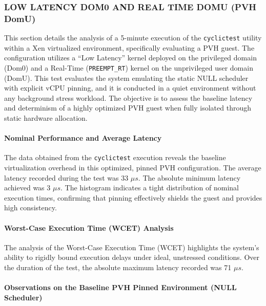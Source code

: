 \subsubsection{LOW LATENCY DOM0 AND REAL TIME DOMU (PVH
DomU)}\label{low-latency-dom0-and-real-time-domu-pvh-domu-2}

This section details the analysis of a 5-minute execution of the
\texttt{cyclictest} utility within a Xen virtualized environment,
specifically evaluating a PVH guest. The configuration utilizes a ``Low
Latency'' kernel deployed on the privileged domain (Dom0) and a
Real-Time (\texttt{PREEMPT\_RT}) kernel on the unprivileged user domain
(DomU). This test evaluates the system emulating the static NULL
scheduler with explicit vCPU pinning, and it is conducted in a quiet
environment without any background stress workload. The objective is to
assess the baseline latency and determinism of a highly optimized PVH
guest when fully isolated through static hardware allocation.

\paragraph{Nominal Performance and Average
Latency}\label{nominal-performance-and-average-latency-28}

The data obtained from the \texttt{cyclictest} execution reveals the
baseline virtualization overhead in this optimized, pinned PVH
configuration. The average latency recorded during the test was 33 $\mu s$.
The absolute minimum latency achieved was 3 $\mu s$. The histogram indicates
a tight distribution of nominal execution times, confirming that pinning
effectively shields the guest and provides high consistency.

\paragraph{Worst-Case Execution Time (WCET)
Analysis}\label{worst-case-execution-time-wcet-analysis-30}

The analysis of the Worst-Case Execution Time (WCET) highlights the
system's ability to rigidly bound execution delays under ideal,
unstressed conditions. Over the duration of the test, the absolute
maximum latency recorded was 71 $\mu s$.

\paragraph{Observations on the Baseline PVH Pinned Environment (NULL
Scheduler)}\label{observations-on-the-baseline-pvh-pinned-environment-null-scheduler}

